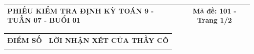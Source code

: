 \documentclass[12pt,a4paper]{article}
\begin{document}
\pagestyle{empty}

\noindent
\begin{tabularx}{\linewidth}{|X|c|}
\hline
\textbf{PHIẾU KIỂM TRA ĐỊNH KỲ TOÁN 9 - TUẦN 07 - BUỔI 01} & \textbf{Mã đề: 101 - Trang 1/2} \\
\hline
\end{tabularx}

\vspace{1.0mm}

\noindent
\begin{tabularx}{\linewidth}{|p{3.2cm}|X|}
\hline
\centering\textbf{ĐIỂM SỐ} & \centering\textbf{LỜI NHẬN XÉT CỦA THẦY CÔ} \tabularnewline
\hline
\rule{0pt}{1.8cm} & \tabularnewline
\hline
\end{tabularx}
\end{document}
